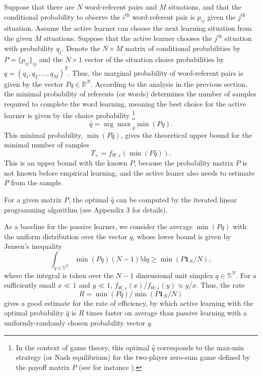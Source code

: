 \documentclass[a4paper,natbib,man]{apa6}
\newcommand{\one}[1]{\mathbf{1}_{#1}}
\newcommand{\Simplex}[1]{\mathbb{S}^{#1}}
\newcommand{\dd}[0]{\text{d}}
\begin{document}
Suppose that there are $N$ word-referent pairs and $M$ situations, and that the conditional probability to observe the $i^{\text{th}}$ word-referent pair is $p_{ij}$ given the $j^{\text{th}}$ situation. 
Assume the active learner can choose the next learning situation from the given $M$ situations. %
Suppose that the active learner chooses the $j^{\text{th}}$ situation with probability $q_{j}$.
Denote the $N \times M$ matrix of conditional probabilities by $P = \{ p_{ij} \}_{ij}$ and the $N \times 1$ vector of the situation choice probabilities by $q = (q_{1}, q_{2}, \ldots, q_{M})^{T}$.
Thus, the marginal probability of word-referent pairs is given by the vector $Pq \in \mathbb{R}^{N}$.
According to the analysis in the previous section, the minimal probability of referents (or words) determines the number of samples required to complete the word learning, meaning
the best choice for the active learner is given by the choice probability \footnote{In the context of game theory, this optimal $\hat{q}$ corresponds to the max-min strategy (or Nash equilibrium) for the two-player zero-sum game defined by the payoff matrix $P$ (see for instance \cite{Maschler:2013}). } 
\[
 \hat{q} = {\arg\max}_{q} \min(Pq).
\]
This minimal probability, $\min(P\hat{q})$, gives the theoretical upper bound for the minimal number of samples $$T_{+}=f_{W,\epsilon}( \min(P \hat{q}) ).$$
This is an upper bound with the known $P$, because the probability matrix
$P$ is not known before empirical learning, and the active leaner also needs to estimate $P$ from the sample.

For a given matrix $P$, the optimal $\hat{q}$ can be computed by the iterated linear programming algorithm (see Appendix 3 for details). %

As a baseline for the passive learner, we consider the average $\min( Pq )$ with the uniform distribution over the vector $q$, whose lower bound is given by Jensen's inequality $$\int_{q\in \Simplex{N}}\min( Pq ) (N-1)!\dd q \ge \min( P \one{N}/N ),$$
where the integral is taken over the $N-1$ dimensional unit simplex $q\in \Simplex{N}$.
For a sufficiently small $x \ll 1$ and $y \ll 1$, $f_{W,\epsilon}(x)/ f_{W,\epsilon}(y) \approx y/ x$.
Thus, the rate $$R = \min(P \hat{q})/ \min(P \one{N}/N)$$ gives a good estimate for the rate of efficiency, by which
active learning with the optimal probability $\hat{q}$ is $R$ times faster on average 
than passive learning with a uniformly-randomly chosen probability vector $q$. %
\end{document}
